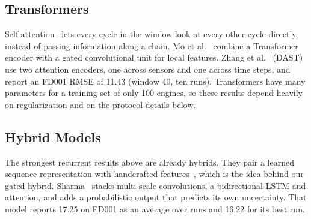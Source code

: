 \subsection{Transformers}
Self-attention~\cite{Vaswani2017attention} lets every cycle in the window look
at every other cycle directly, instead of passing information along a chain.
Mo et al.~\cite{Mo2021remaining} combine a Transformer encoder with a gated
convolutional unit for local features. Zhang et al.~\cite{Zhang2022dual}
(DAST) use two attention encoders, one across sensors and one across time
steps, and report an FD001 RMSE of 11.43 (window 40, ten runs). Transformers
have many parameters for a training set of only 100 engines, so these results
depend heavily on regularization and on the protocol details below.

\subsection{Hybrid Models}
The strongest recurrent results above are already hybrids. They pair a learned
sequence representation with handcrafted
features~\cite{Chen2021machine,Jin2022bilstm}, which is the idea behind our
gated hybrid. Sharma~\cite{Sharma2025uncertainty} stacks multi-scale
convolutions, a bidirectional LSTM and attention, and adds a probabilistic
output that predicts its own uncertainty. That model reports 17.25 on FD001 as
an average over runs and 16.22 for its best run.

